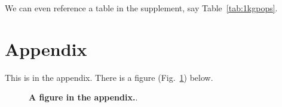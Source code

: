 \documentclass[]{article}
\begin{document}
\lipsum[1]

We can even reference a table in the supplement, say Table~\ref{tab:1kgpops}.

\break




\break

\renewcommand{\theequation}{A\arabic{equation}}
\renewcommand{\thefigure}{A\arabic{figure}}
\renewcommand{\thetable}{A\arabic{table}}
\setcounter{figure}{0}
\setcounter{equation}{0}
\setcounter{table}{0}

\appendix
\renewcommand{\thesection}{A\arabic{section}}

\section{Appendix} \label{appendix}

This is in the appendix. There is a figure (Fig.~\ref{fig:A1}) below.

\lipsum[1-3]

\begin{figure}[ht]
\begin{center}
\caption{\textbf{A figure in the appendix.}.
}
\label{fig:A1}
\end{center}
\end{figure}
\end{document}
